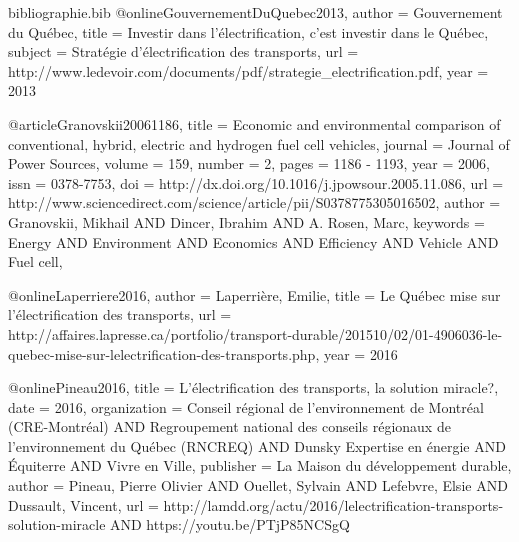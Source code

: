 \begin{filecontents}{bibliographie.bib}
    @online{GouvernementDuQuebec2013,
        author  = {Gouvernement du Québec},
        title   = {Investir dans l’électrification, c’est investir dans le Québec},
        subject = {Stratégie d’électrification des transports},
        url     = {http://www.ledevoir.com/documents/pdf/strategie_electrification.pdf},
        year    = {2013}
    }

    @article{Granovskii20061186,
        title    = {Economic and environmental comparison of conventional, hybrid, electric and hydrogen fuel cell vehicles},
        journal  = {Journal of Power Sources},
        volume   = {159},
        number   = {2},
        pages    = {1186 - 1193},
        year     = {2006},
        issn     = {0378-7753},
        doi      = {http://dx.doi.org/10.1016/j.jpowsour.2005.11.086},
        url      = {http://www.sciencedirect.com/science/article/pii/S0378775305016502},
        author   = {Granovskii, Mikhail AND Dincer, Ibrahim AND A. Rosen, Marc},
        keywords = {Energy AND Environment AND Economics AND Efficiency AND Vehicle AND Fuel cell},
    }

    @online{Laperriere2016,
        author = {Laperrière, Emilie},
        title  = {Le Québec mise sur l'électrification des transports},
        url    = {http://affaires.lapresse.ca/portfolio/transport-durable/201510/02/01-4906036-le-quebec-mise-sur-lelectrification-des-transports.php},
        year   = {2016}
    }

    @online{Pineau2016,
        title        = {L'électrification des transports, la solution miracle?},
        date         = {2016},
        organization = {Conseil régional de l’environnement de Montréal (CRE-Montréal) AND Regroupement national des conseils régionaux de l’environnement du Québec (RNCREQ) AND Dunsky Expertise en énergie AND Équiterre AND Vivre en Ville},
        publisher    = {La Maison du développement durable},
        author       = {Pineau, Pierre Olivier AND Ouellet, Sylvain AND Lefebvre, Elsie AND Dussault, Vincent},
        url          = {http://lamdd.org/actu/2016/lelectrification-transports-solution-miracle AND https://youtu.be/PTjP85NCSgQ}
    }
\end{filecontents}
